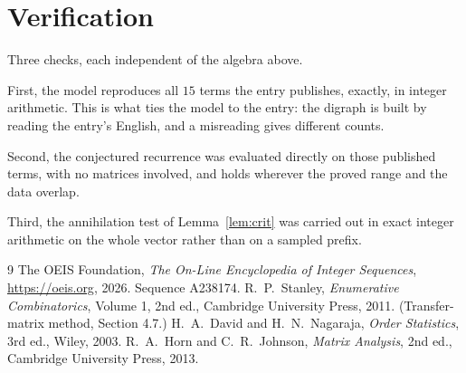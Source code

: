\documentclass[11pt,a4paper]{article}
\theoremstyle{plain}
\theoremstyle{definition}
\begin{document}
\section{Verification}

Three checks, each independent of the algebra above.

First, the model reproduces all $15$ terms the entry publishes, exactly, in integer
arithmetic. This is what ties the model to the entry: the digraph is built by reading the
entry's English, and a misreading gives different counts.

Second, the conjectured recurrence was evaluated directly on those published terms, with no
matrices involved, and holds wherever the proved range and the data overlap.

Third, the annihilation test of Lemma~\ref{lem:crit} was carried out in exact integer
arithmetic on the whole vector rather than on a sampled prefix.

\begin{thebibliography}{9}
 The OEIS Foundation, \emph{The On-Line Encyclopedia of Integer
Sequences}, \url{https://oeis.org}, 2026. Sequence A238174.
 R.~P.~Stanley, \emph{Enumerative Combinatorics}, Volume 1, 2nd ed.,
Cambridge University Press, 2011. (Transfer-matrix method, Section 4.7.)
 H.~A.~David and H.~N.~Nagaraja, \emph{Order Statistics}, 3rd ed., Wiley,
2003.
 R.~A.~Horn and C.~R.~Johnson, \emph{Matrix Analysis}, 2nd ed., Cambridge
University Press, 2013.
\end{thebibliography}
\end{document}
